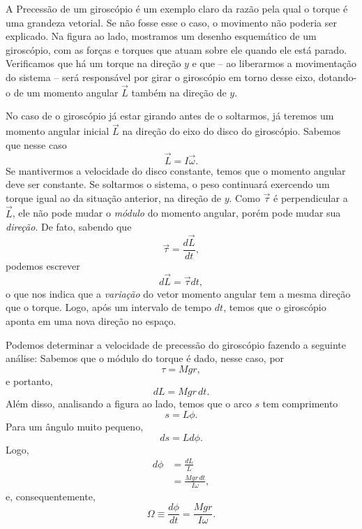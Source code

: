A Precessão de um giroscópio é um exemplo claro da razão pela qual o torque é uma grandeza vetorial. Se não fosse esse o caso, o movimento não poderia ser explicado. Na figura ao lado, mostramos um desenho esquemático de um giroscópio, com as forças e torques que atuam sobre ele quando ele está parado. Verificamos que há um torque na direção $y$ e que -- ao liberarmos a movimentação do sistema -- será responsável por girar o giroscópio em torno desse eixo, dotando-o de um momento angular $\vec{L}$ também na direção de $y$.

No caso de o giroscópio já estar girando antes de o soltarmos, já teremos um momento angular inicial $\vec{L}$ na direção do eixo do disco do giroscópio. Sabemos que nesse caso 
\begin{equation}
  \vec{L} = I\vec{\omega}.
\end{equation}
%
Se mantivermos a velocidade do disco constante, temos que o momento angular deve ser constante. Se soltarmos o sistema, o peso continuará exercendo um torque igual ao da situação anterior, na direção de $y$. Como $\vec{\tau}$ é perpendicular a $\vec{L}$, ele não pode mudar o \emph{módulo} do momento angular, porém pode mudar sua \emph{direção}. De fato, sabendo que
\begin{equation}
  \vec{\tau} = \frac{d\vec{L}}{dt},
\end{equation}
%
podemos escrever
\begin{equation}
  d\vec{L} = \vec{\tau} dt,
\end{equation}
%
o que nos indica que a \emph{variação} do vetor momento angular tem a mesma direção que o torque. Logo, após um intervalo de tempo $dt$, temos que o giroscópio aponta em uma nova direção no espaço.

Podemos determinar a velocidade de precessão do giroscópio fazendo a seguinte análise: Sabemos que o módulo do torque é dado, nesse caso, por
\begin{equation}
  \tau = Mgr,
\end{equation}
%
e portanto,
\begin{equation}
  dL = Mgr\,dt.
\end{equation}
%
Além disso, analisando a figura ao lado, temos que o arco $s$ tem comprimento
\begin{equation}
  s = L \phi.
\end{equation}
%
Para um ângulo muito pequeno,
\begin{equation}
  ds = L d\phi.
\end{equation}
%
Logo,
\begin{align}
  d\phi &= \frac{dL}{L} \\
  &= \frac{Mgr\,dt}{I\omega},
\end{align}
%
e, consequentemente,
\begin{equation}
  \Omega \equiv \frac{d\phi}{dt} = \frac{Mgr}{I\omega}.
\end{equation}


